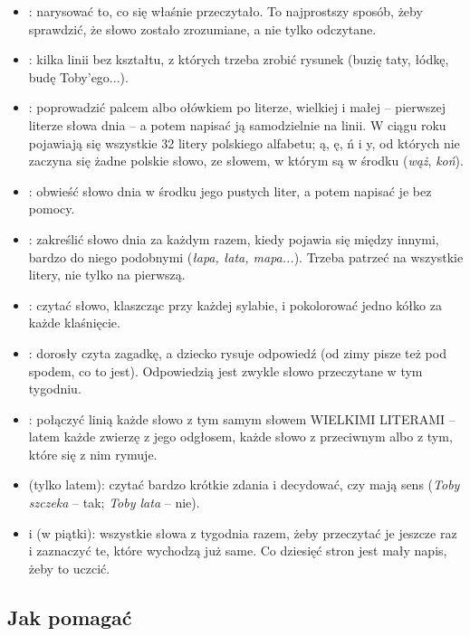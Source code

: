 {\small
\begin{itemize}[leftmargin=6mm, itemsep=1pt, topsep=2pt]
\item \textbf{\lblDibuja}: narysować to, co się właśnie przeczytało.
  To najprostszy sposób, żeby sprawdzić, że słowo zostało zrozumiane, a
  nie tylko odczytane.
\item \textbf{\lblCompleta}: kilka linii bez kształtu, z których trzeba
  zrobić rysunek (buzię taty, łódkę, budę Toby'ego...).
\item \textbf{\lblTraza}: poprowadzić palcem albo ołówkiem po literze,
  wielkiej i małej -- pierwszej literze słowa dnia -- a potem napisać ją
  samodzielnie na linii. W ciągu roku pojawiają się wszystkie 32 litery
  polskiego alfabetu; ą, ę, ń i y, od których nie zaczyna się żadne
  polskie słowo, ze słowem, w którym są w środku (\emph{wąż},
  \emph{koń}).
\item \textbf{\lblEscribe}: obwieść słowo dnia w środku jego pustych
  liter, a potem napisać je bez pomocy.
\item \textbf{\lblEncuentra}: zakreślić słowo dnia za każdym razem, kiedy
  pojawia się między innymi, bardzo do niego podobnymi (\emph{łapa,
  łata, mapa...}). Trzeba patrzeć na wszystkie litery, nie tylko na
  pierwszą.
\item \textbf{\lblPalmadas}: czytać słowo, klaszcząc przy każdej
  sylabie, i pokolorować jedno kółko za każde klaśnięcie.
\item \textbf{\lblAdivina}: dorosły czyta zagadkę, a dziecko rysuje
  odpowiedź (od zimy pisze też pod spodem, co to jest). Odpowiedzią jest
  zwykle słowo przeczytane w tym tygodniu.
\item \textbf{\lblUne}: połączyć linią każde słowo z tym samym słowem
  WIELKIMI LITERAMI -- latem każde zwierzę z jego odgłosem, każde słowo z
  przeciwnym albo z tym, które się z nim rymuje.
\item \textbf{\lblSiNo} (tylko latem): czytać bardzo krótkie zdania i
  decydować, czy mają sens (\emph{Toby szczeka} -- tak; \emph{Toby
  lata} -- nie).
\item \textbf{\lblRelee} i \textbf{\lblRepasa} (w piątki): wszystkie
  słowa z tygodnia razem, żeby przeczytać je jeszcze raz i zaznaczyć te,
  które wychodzą już same. Co dziesięć stron jest mały napis, żeby to
  uczcić.
\end{itemize}}

\subsection*{Jak pomagać}

